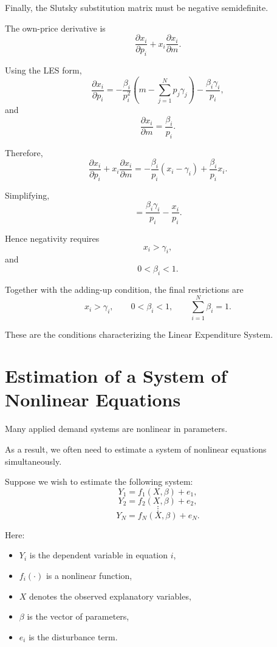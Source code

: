 Finally,
the Slutsky substitution matrix must be negative semidefinite.

The own-price derivative is
\[
\frac{\partial x_i}{\partial p_i}
+
x_i\frac{\partial x_i}{\partial m}.
\]

Using the LES form,
\[
\frac{\partial x_i}{\partial p_i}
=
-
\frac{\beta_i}{p_i^2}
\left(
m-\sum_{j=1}^N p_j\gamma_j
\right)
-
\frac{\beta_i\gamma_i}{p_i},
\]
and
\[
\frac{\partial x_i}{\partial m}
=
\frac{\beta_i}{p_i}.
\]

Therefore,
\[
\frac{\partial x_i}{\partial p_i}
+
x_i\frac{\partial x_i}{\partial m}
=
-
\frac{\beta_i}{p_i}(x_i-\gamma_i)
+
\frac{\beta_i}{p_i}x_i.
\]

Simplifying,
\[
=
\frac{\beta_i\gamma_i}{p_i}
-
\frac{x_i}{p_i}.
\]

Hence negativity requires
\[
x_i>\gamma_i,
\]
and
\[
0<\beta_i<1.
\]

Together with the adding-up condition,
the final restrictions are
\[
x_i>\gamma_i,
\qquad
0<\beta_i<1,
\qquad
\sum_{i=1}^N\beta_i=1.
\]

These are the conditions characterizing the Linear Expenditure System.



\section{Estimation of a System of Nonlinear Equations}

Many applied demand systems are nonlinear in parameters.

As a result,
we often need to estimate a system of nonlinear equations simultaneously.

Suppose we wish to estimate the following system:
\[
Y_1=f_1(X,\beta)+e_1,
\]
\[
Y_2=f_2(X,\beta)+e_2,
\]
\[
\vdots
\]
\[
Y_N=f_N(X,\beta)+e_N.
\]

Here:

\begin{itemize}
    \item \(Y_i\) is the dependent variable in equation \(i\),
    \item \(f_i(\cdot)\) is a nonlinear function,
    \item \(X\) denotes the observed explanatory variables,
    \item \(\beta\) is the vector of parameters,
    \item \(e_i\) is the disturbance term.
\end{itemize}

